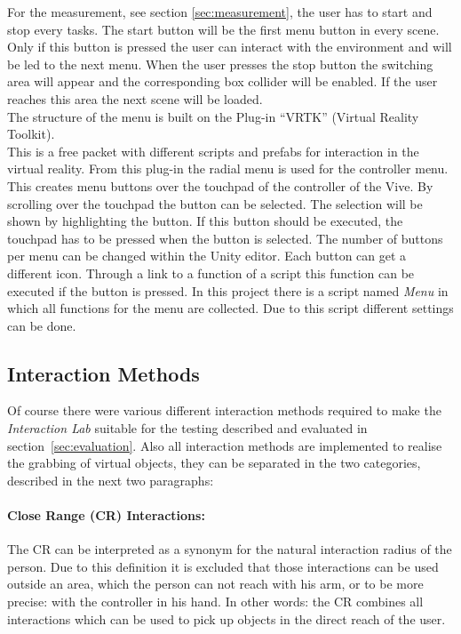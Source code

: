 For the measurement, see section \ref{sec:measurement}, the user has to start and stop every tasks. The start button will be the first menu button in every scene. Only if this button is pressed the user can interact with the environment and will be led to the next menu. When the user presses the stop button the switching area will appear and the corresponding box collider will be enabled. If the user reaches this area the next scene will be loaded.\\
The structure of the menu is built on the Plug-in ``VRTK'' (Virtual Reality Toolkit). \cite{asset_VRTK} \cite{VRTK}\\
This is a free packet with different scripts and prefabs for interaction in the virtual reality. From this plug-in the radial menu is used for the controller menu. This creates menu buttons over the touchpad of the controller of the Vive. By scrolling over the touchpad the button can be selected. The selection will be shown by highlighting the button. If this button should be executed, the touchpad has to be pressed when the button is selected. The number of buttons per menu can be changed within the Unity editor. Each button can get a different icon. Through a link to a function of a script this function can be executed if the button is pressed. In this project there is a script named \textit{Menu} in which all functions for the menu are collected. Due to this script different settings can be done. %


\subsection{Interaction Methods}\label{sec:Interactions}
Of course there were various different interaction methods required to make the \textit{Interaction Lab} suitable for the testing described and evaluated in section~\ref{sec:evaluation}. Also all interaction methods are implemented to realise the grabbing of virtual objects, they can be separated in the two categories, described in the next two paragraphs:

\paragraph{Close Range (CR) Interactions:} The CR can be interpreted as a synonym for the natural interaction radius of the person. Due to this definition it is excluded that those interactions can be used outside an area, which the person can not reach with his arm, or to be more precise: with the controller in his hand. In other words: the CR combines all interactions which can be used to pick up objects in the direct reach of the user.

